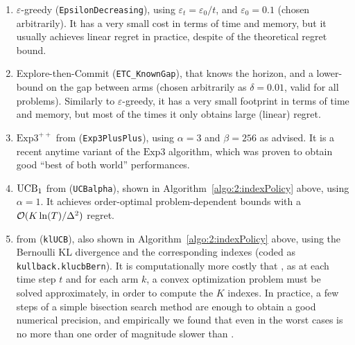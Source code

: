 \begin{enumerate}
    \item
    $\varepsilon$-greedy \cite{Bubeck12} (\texttt{EpsilonDecreasing}),
    using $\varepsilon_t = \varepsilon_0 / t$, and $\varepsilon_0 = 0.1$ (chosen arbitrarily).
    It has a very small cost in terms of time and memory, but it usually achieves linear regret in practice, despite of the theoretical regret bound.

    \item
    Explore-then-Commit \cite{GarivierETC2016} (\texttt{ETC\_KnownGap}),
    that knows the horizon, and a lower-bound on the gap between arms (chosen arbitrarily as $\delta=0.01$, valid for all problems).
    Similarly to $\varepsilon$-greedy, it has a very small footprint in terms of time and memory, but most of the times it only obtains large (linear) regret.

    \item
    $\mathrm{Exp}3^{++}$ from \cite{Seldin17} (\texttt{Exp3PlusPlus}), using $\alpha=3$ and $\beta=256$ as advised.
    It is a recent anytime variant of the $\mathrm{Exp3}$ algorithm, which was proven to obtain good ``best of both world'' performances.

    \item
    $\mathrm{UCB}_1$ from \cite{Auer02} (\texttt{UCBalpha}), shown in Algorithm~\ref{algo:2:indexPolicy} above, using $\alpha=1$.
    It achieves order-optimal problem-dependent bounds with a $\mathcal{O}(K\ln(T)/\Delta^2)$ regret.

    \item
    \klUCB{} from \cite{KLUCBJournal} (\texttt{klUCB}), also shown in Algorithm~\ref{algo:2:indexPolicy} above, using the Bernoulli KL divergence and the corresponding \klUCB{} indexes (coded as \texttt{kullback.klucbBern}).
    It is computationally more costly that \UCB, as at each time step $t$ and for each arm $k$, a convex optimization problem must be solved approximately, in order to compute the $K$ indexes.
    In practice, a few steps of a simple bisection search method are enough to obtain a good numerical precision, and empirically we found that even in the worst cases \klUCB{} is no more than one order of magnitude slower than \UCB.


\end{enumerate}
